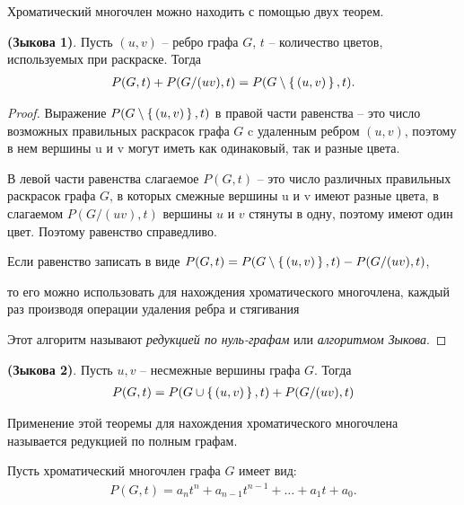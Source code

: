 Хроматический многочлен можно находить с помощью двух теорем.

\begin{theorem}
    \textbf{(Зыкова 1)}. Пусть $(u, v)$ -- ребро графа $G$, $t$ -- количество цветов,
    используемых при раскраске. Тогда
    \begin{align*}
        P(G,t) + P(G/(uv), t) = P(G \setminus \set{(u,v)},t).
    \end{align*}
\end{theorem}

\begin{proof}
    Выражение $P(G \setminus \set{(u,v)},t)$ в правой части равенства -- это
    число возможных правильных раскрасок графа $G$ c удаленным ребром
    $(u,v)$, поэтому в нем вершины u и v могут иметь как одинаковый, так и
    разные цвета.
    
    В левой части равенства слагаемое $P(G,t)$ -- это число различных
    правильных раскрасок графа $G$, в которых смежные вершины u и v имеют
    разные цвета, в слагаемом $P(G/(uv), t)$ вершины $u$ и $v$ стянуты в одну,
    поэтому имеют один цвет. Поэтому равенство справедливо.
    
    Если равенство записать в виде $P(G,t) = P(G \setminus \set{(u,v)},t) - P(G/(uv), t)$,
    
    то его можно использовать для нахождения хроматического многочлена,
    каждый раз производя операции удаления ребра и стягивания
    
    Этот алгоритм называют \textit{редукцией по нуль-графам} или \textit{алгоритмом
    Зыкова}.
\end{proof}

\begin{theorem}
    \textbf{(Зыкова 2)}. Пусть $u, v$ -- несмежные вершины графа $G$. Тогда
    \begin{align*}
        P(G,t) = P(G \cup \set{(u,v)},t) + P(G/(uv), t)
    \end{align*}
\end{theorem}

Применение этой теоремы для нахождения хроматического многочлена
называется редукцией по полным графам.


\newpage
Пусть хроматический многочлен графа $G$ имеет вид:
\begin{align*}
    P(G,t) = a_nt^n + a_{n-1}t^{n-1}+ \dots +a_1t+a_0.
\end{align*}

